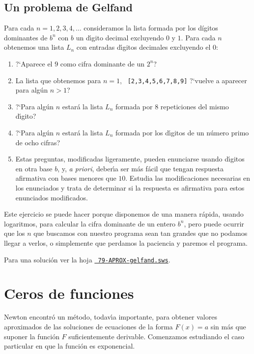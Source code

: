 \subsection{Un problema de Gelfand}
\begin{ejer}
 
Para cada $n=1,2,3,4,\dots$ consideramos la lista formada por los d\'igitos
dominantes de $b^n$ con $b$ un d\'{\i}gito decimal excluyendo $0$ y $1$. Para
cada $n$ obtenemos una lista $L_n$  con entradas d\'{\i}gitos decimales
excluyendo el $0$:

\begin{enumerate}
 \item ?`Aparece el $9$ como cifra dominante de un $2^n$?
 \item La lista que obtenemos para $n=1$, {\tt
[2,3,4,5,6,7,8,9]} ?`vuelve a aparecer para alg\'un $n>1$? 
\item ?`Para alg\'un $n$ estar\'a la lista $L_n$ formada por $8$ repeticiones
del mismo d\'{\i}gito?
\item ?`Para alg\'un $n$ estar\'a la lista $L_n$ formada por los d\'{\i}gitos de
un n\'umero primo de ocho cifras?
 
 \item Estas preguntas, modificadas ligeramente, pueden enunciarse usando
d\'{\i}gitos en otra base $b$, y, {\itshape a priori}, deber\'{\i}a ser m\'as
f\'acil que tengan respuesta afirmativa con bases menores que $10$. Estudia las
modificaciones necesarias en los enunciados y trata de determinar si la
respuesta es afirmativa para estos enunciados modificados.
 \end{enumerate}

 Este ejercicio se puede hacer porque disponemos de una manera r\'apida, usando
logaritmos, para calcular la cifra dominante de un entero $b^n$, pero puede
ocurrir que los $n$ que buscamos con nuestro programa sean tan grandes que no
podamos llegar a verlos, o simplemente que perdamos la paciencia y paremos el
programa.

Para una soluci\'on ver la hoja 
\href{http://sage.mat.uam.es:8888/home/pub/??/}{\tt
79-APROX-gelfand.sws}.

\end{ejer}

\section{Ceros de funciones}\label{raices}


Newton encontr\'o un m\'etodo, todav\'{\i}a importante,  para obtener valores
aproximados de las soluciones de ecuaciones de la forma $F(x)=a$ sin m\'as que
suponer la funci\'on $F$ suficientemente derivable. Comenzamos estudiando el
caso particular en que la funci\'on es exponencial.


